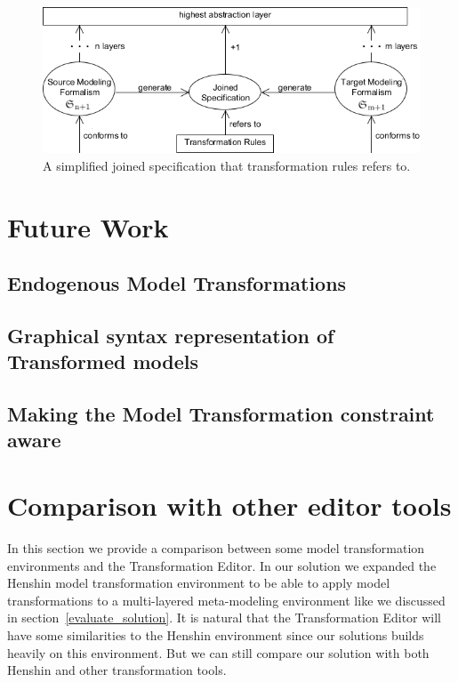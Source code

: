 \begin{figure}[H]
	\centering
	\includegraphics[scale=0.7]{./Figures/simple_modeling_formalism.png}
	\caption[Simplified joined specification]
	{A simplified joined specification that transformation rules refers to.}
	\label{fig:simple_modeling_formalism}
\end{figure}



\section{Future Work}

\subsection{Endogenous Model Transformations}

\subsection{Graphical syntax representation of Transformed models}

\subsection{Making the Model Transformation constraint aware}


\section{Comparison with other editor tools}

In this section we provide a comparison between some model transformation
environments and the Transformation Editor. In our solution we
expanded the Henshin model transformation environment to be able to apply model
transformations to a multi-layered meta-modeling environment like we discussed
in section~\ref{evaluate_solution}. It is natural that the Transformation
Editor will have some similarities to the Henshin environment since our
solutions builds heavily on this environment. But we can still compare our
solution with both Henshin and other transformation tools.

